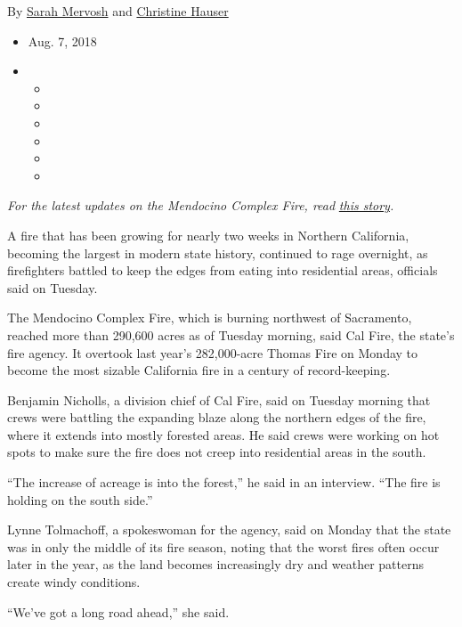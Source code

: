 By \href{https://www.nytimes3xbfgragh.onion/by/sarah-mervosh}{Sarah
Mervosh} and
\href{http://www.nytimes3xbfgragh.onion/by/christine-hauser}{Christine
Hauser}

\begin{itemize}
\item
  Aug. 7, 2018
\item
  \begin{itemize}
  \item
  \item
  \item
  \item
  \item
  \item
  \end{itemize}
\end{itemize}

\emph{For the latest updates on the Mendocino Complex Fire, read}
\href{https://www.nytimes3xbfgragh.onion/2018/08/07/us/california-fires-mendocino.html}{\emph{this
story}}\emph{.}

A fire that has been growing for nearly two weeks in Northern
California, becoming the largest in modern state history, continued to
rage overnight, as firefighters battled to keep the edges from eating
into residential areas, officials said on Tuesday.

The Mendocino Complex Fire, which is burning northwest of Sacramento,
reached more than 290,600 acres as of Tuesday morning, said Cal Fire,
the state's fire agency. It overtook last year's 282,000-acre Thomas
Fire on Monday to become the most sizable California fire in a century
of record-keeping.

Benjamin Nicholls, a division chief of Cal Fire, said on Tuesday morning
that crews were battling the expanding blaze along the northern edges of
the fire, where it extends into mostly forested areas. He said crews
were working on hot spots to make sure the fire does not creep into
residential areas in the south.

``The increase of acreage is into the forest,'' he said in an interview.
``The fire is holding on the south side.''

Lynne Tolmachoff, a spokeswoman for the agency, said on Monday that the
state was in only the middle of its fire season, noting that the worst
fires often occur later in the year, as the land becomes increasingly
dry and weather patterns create windy conditions.

``We've got a long road ahead,'' she said.

